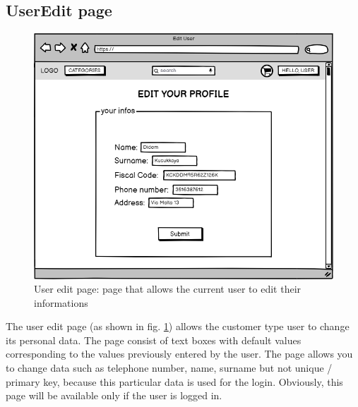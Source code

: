 \subsection{UserEdit page}
    \begin{figure}[H]
        \centering
        \includegraphics[width=\textwidth,height=0.7\textheight,keepaspectratio]{mockups/userEditPageMockup.png}
            \caption{User edit page: page that allows the current user to edit their informations}
            \label{fig:UserEdit}
    \end{figure}

The user edit page (as shown in fig. \ref{fig:UserEdit}) allows the customer type user to change its personal data. The page consist of text boxes with default values corresponding to the values previously entered by the user. The page allows you to change data such as telephone number, name, surname but not unique / primary key, because this particular data is used for the login.
Obviously, this page will be available only if the user is logged in.

    
